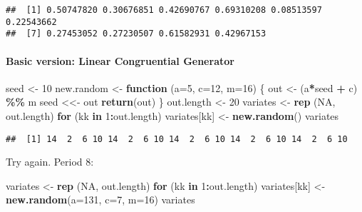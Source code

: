 \documentclass[
]{article}
\newenvironment{Shaded}{\begin{snugshade}}{\end{snugshade}}
\newcommand{\AttributeTok}[1]{\textcolor[rgb]{0.13,0.29,0.53}{#1}}
\newcommand{\ConstantTok}[1]{\textcolor[rgb]{0.56,0.35,0.01}{#1}}
\newcommand{\ControlFlowTok}[1]{\textcolor[rgb]{0.13,0.29,0.53}{\textbf{#1}}}
\newcommand{\DecValTok}[1]{\textcolor[rgb]{0.00,0.00,0.81}{#1}}
\newcommand{\FunctionTok}[1]{\textcolor[rgb]{0.13,0.29,0.53}{\textbf{#1}}}
\newcommand{\NormalTok}[1]{#1}
\newcommand{\OtherTok}[1]{\textcolor[rgb]{0.56,0.35,0.01}{#1}}
\newcommand{\SpecialCharTok}[1]{\textcolor[rgb]{0.81,0.36,0.00}{\textbf{#1}}}
\begin{document}
\begin{verbatim}
##  [1] 0.50747820 0.30676851 0.42690767 0.69310208 0.08513597 0.22543662
##  [7] 0.27453052 0.27230507 0.61582931 0.42967153
\end{verbatim}

\paragraph{Basic version: Linear Congruential
Generator}\label{basic-version-linear-congruential-generator}

\begin{Shaded}
\begin{Highlighting}[]
\NormalTok{seed }\OtherTok{\textless{}{-}} \DecValTok{10}
\NormalTok{new.random }\OtherTok{\textless{}{-}} \ControlFlowTok{function}\NormalTok{ (}\AttributeTok{a=}\DecValTok{5}\NormalTok{, }\AttributeTok{c=}\DecValTok{12}\NormalTok{, }\AttributeTok{m=}\DecValTok{16}\NormalTok{) \{}
\NormalTok{  out }\OtherTok{\textless{}{-}}\NormalTok{ (a}\SpecialCharTok{*}\NormalTok{seed }\SpecialCharTok{+}\NormalTok{ c) }\SpecialCharTok{\%\%}\NormalTok{ m}
\NormalTok{  seed }\OtherTok{\textless{}\textless{}{-}}\NormalTok{ out}
  \FunctionTok{return}\NormalTok{(out)}
\NormalTok{\}}
\NormalTok{out.length }\OtherTok{\textless{}{-}} \DecValTok{20}
\NormalTok{variates }\OtherTok{\textless{}{-}} \FunctionTok{rep}\NormalTok{ (}\ConstantTok{NA}\NormalTok{, out.length)}
\ControlFlowTok{for}\NormalTok{ (kk }\ControlFlowTok{in} \DecValTok{1}\SpecialCharTok{:}\NormalTok{out.length) variates[kk] }\OtherTok{\textless{}{-}} \FunctionTok{new.random}\NormalTok{()}
\NormalTok{variates}
\end{Highlighting}
\end{Shaded}

\begin{verbatim}
##  [1] 14  2  6 10 14  2  6 10 14  2  6 10 14  2  6 10 14  2  6 10
\end{verbatim}

Try again. Period 8:

\begin{Shaded}
\begin{Highlighting}[]
\NormalTok{variates }\OtherTok{\textless{}{-}} \FunctionTok{rep}\NormalTok{ (}\ConstantTok{NA}\NormalTok{, out.length)}
\ControlFlowTok{for}\NormalTok{ (kk }\ControlFlowTok{in} \DecValTok{1}\SpecialCharTok{:}\NormalTok{out.length) variates[kk] }\OtherTok{\textless{}{-}} \FunctionTok{new.random}\NormalTok{(}\AttributeTok{a=}\DecValTok{131}\NormalTok{, }\AttributeTok{c=}\DecValTok{7}\NormalTok{, }\AttributeTok{m=}\DecValTok{16}\NormalTok{)}
\NormalTok{variates}
\end{Highlighting}
\end{Shaded}
\end{document}
